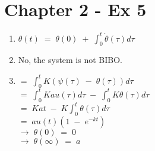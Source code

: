 \documentclass[11pt]{article}
\newenvironment{qparts}{\begin{enumerate}[{(}a{)}]}{\end{enumerate}}
\begin{document}
\section*{Chapter 2 - Ex 5}
\begin{qparts}
\item $\theta \left( t \right)\; =\; \theta \left( 0 \right)\; +\; \int_{0}^{t}{\dot{\theta }\left( \tau  \right)d\tau }$\\

\item No, the system is not BIBO.
\item $=\; \int_{0}^{t}{K\left( \psi \left( \tau  \right)\; -\; \theta \left( \tau  \right) \right)d\tau }$\\

$=\; \int_{0}^{t}{Kau\left( \tau  \right)d\tau \; -\; \int_{0}^{t}{K\theta \left( \tau  \right)d\tau }}$\\

$=\; Kat\; -\; K\int_{0}^{t}{\theta \left( \tau  \right)d\tau }$\\

$=\; au\left( t \right)\left( 1\; -\; e^{-kt} \right)$\\

$\rightarrow \; \theta \left( 0 \right)\; =\; 0$\\

$\rightarrow \; \theta \left( \infty  \right)\; =\; a$
\end{qparts}
\end{document}
